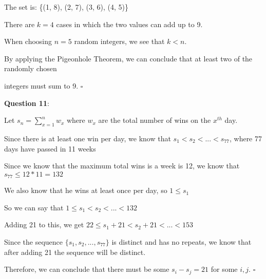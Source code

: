 \documentclass{article} %
\newcommand{\question}[2][]{\begin{flushleft}
        \textbf{Question #1}: #2

\end{flushleft}}
\begin{document}
    The set is: \{(1, 8), (2, 7), (3, 6), (4, 5)\}

    There are $k = 4$ cases in which the two values can add up to 9.

    When choosing $n=5$ random integers, we see that $k < n$. 

    By applying the Pigeonhole Theorem, we can conclude that at least two of the randomly chosen 
    
    integers must sum to 9. $\square$

    
    \question[11]{}

    Let $s_n = \sum_{x=1} ^n w_x$ where $w_x$ are the total number of wins on the $x^{th}$ day.

    Since there is at least one win per day, we know that $s_1 < s_2 < ... < s_{77}$, where 77 days have 
    \tabto{0.5cm}passed in 11 weeks

    Since we know that the maximum total wins is a week is 12, we know that $s_{77} \leq 12*11 = 132$

    We also know that he wins at least once per day, so $1 \leq s_1$

    So we can say that $1 \leq s_1 < s_2 < ... < 132$

    Adding 21 to this, we get $22 \leq s_1 + 21 < s_2 + 21 < ... < 153$

    Since the sequence $\{s_1, s_2, ...,s_{77}\}$ is distinct and has no repeats, we know that after adding 21 
    \tabto{0.5cm}the sequence will be distinct.

    Therefore, we can conclude that there must be some $s_i - s_j = 21$ for some $i, j$. $\square$
    
\end{document}
